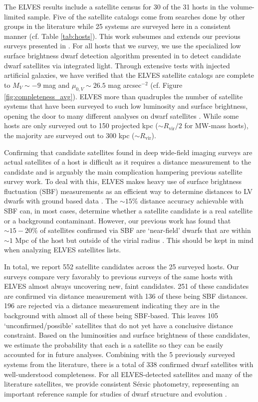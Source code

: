 \documentclass[twocolumn]{aastex62}
\begin{document}
The ELVES results include a satellite census for 30 of the 31 hosts in the volume-limited sample. Five of the satellite catalogs come from searches done by other groups in the literature while 25 systems are surveyed here in a consistent manner (cf. Table \ref{tab:hosts}). This work subsumes and extends our previous surveys presented in \citet{carlsten2020a, carlsten2020b}. For all hosts that we survey, we use the specialized low surface brightness dwarf detection algorithm presented in \citet{carlsten2020a} to detect candidate dwarf satellites via integrated light. Through extensive tests with injected artificial galaxies, we have verified that the ELVES satellite catalogs are complete to $M_V\sim-9$ mag and $\mu_{0,V}\sim26.5$ mag arcsec$^{-2}$ (cf. Figure \ref{fig:completeness_avg}). ELVES more than quadruples the number of satellite systems that have been surveyed to such low luminosity and surface brightness, opening the door to many different analyses on dwarf satellites \citep[e.g.][]{carlsten2021a, carlsten2021b}. While some hosts are only surveyed out to 150 projected kpc ($\sim R_\mathrm{vir}/2$ for MW-mass hosts), the majority are surveyed out to 300 kpc ($\sim R_\mathrm{vir}$).

Confirming that candidate satellites found in deep wide-field imaging surveys are actual satellites of a host is difficult as it requires a distance measurement to the candidate and is arguably the main complication hampering previous satellite survey work. To deal with this, ELVES makes heavy use of surface brightness fluctuation (SBF) measurements as an efficient way to determine distances to LV dwarfs with ground based data \citep[e.g.][]{sbf_calib, greco2020}. The $\sim15\%$ distance accuracy achievable with SBF can, in most cases, determine whether a satellite candidate is a real satellite or a background contaminant. However, our previous work has found that $\sim15-20\%$ of satellites confirmed via SBF are `near-field' dwarfs that are within $\sim1$ Mpc of the host but outside of the virial radius \citep{carlsten2020b}. This should be kept in mind when analyzing ELVES satellites lists. 

In total, we report 552 satellite candidates across the 25 surveyed hosts. Our surveys compare very favorably to previous surveys of the same hosts with ELVES almost always uncovering new, faint candidates. 251 of these candidates are confirmed via distance measurement with 136 of these being SBF distances. 196 are rejected via a distance measurement indicating they are in the background with almost all of these being SBF-based. This leaves 105 `unconfirmed/possible' satellites that do not yet have a conclusive distance constraint. Based on the luminosities and surface brightness of these candidates, we estimate the probability that each is a satellite so they can be easily accounted for in future analyses. Combining with the 5 previously surveyed systems from the literature, there is a total of 338 confirmed dwarf satellites with well-understood completeness. For all  ELVES-detected satellites and many of the literature satellites, we provide consistent S\'{e}rsic photometry, representing an important reference sample for studies of dwarf structure and evolution \citep[e.g.][]{carlsten2021a}. 
\end{document}
